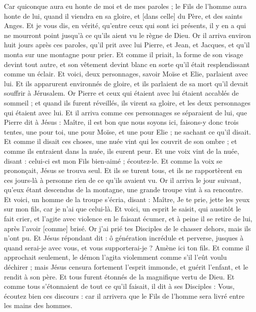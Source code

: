 \begin{multicols}{2}
Car quiconque aura eu honte de moi et de mes paroles ; le Fils de l'homme aura honte de lui, quand il viendra en sa gloire, et [dans celle] du Père, et des saints Anges.
Et je vous dis, en vérité, qu'entre ceux qui sont ici présents, il y en a qui ne mourront point jusqu'à ce qu'ils aient vu le règne de Dieu.
Or il arriva environ huit jours après ces paroles, qu'il prit avec lui Pierre, et Jean, et Jacques, et qu'il monta sur une montagne pour prier.
Et comme il priait, la forme de son visage devint tout autre, et son vêtement devint blanc en sorte qu'il était resplendissant comme un éclair.
Et voici, deux personnages, savoir Moïse et Elie, parlaient avec lui.
Et ils apparurent environnés de gloire, et ils parlaient de sa mort qu'il devait souffrir à Jérusalem.
Or Pierre et ceux qui étaient avec lui étaient accablés de sommeil ; et quand ils furent réveillés, ils virent sa gloire, et les deux personnages qui étaient avec lui.
Et il arriva comme ces personnages se séparaient de lui, que Pierre dit à Jésus : Maître, il est bon que nous soyons ici, faisons-y donc trois tentes, une pour toi, une pour Moïse, et une pour Elie ; ne sachant ce qu'il disait.
Et comme il disait ces choses, une nuée vint qui les couvrit de son ombre ; et comme ils entraient dans la nuée, ils eurent peur.
Et une voix vint de la nuée, disant : celui-ci est mon Fils bien-aimé ; écoutez-le.
Et comme la voix se prononçait, Jésus se trouva seul. Et ils se turent tous, et ils ne rapportèrent en ces jours-là à personne rien de ce qu'ils avaient vu.
Or il arriva le jour suivant, qu'eux étant descendus de la montagne, une grande troupe vint à sa rencontre.
Et voici, un homme de la troupe s'écria, disant : Maître, Je te prie, jette les yeux sur mon fils, car je n'ai que celui-là.
Et voici, un esprit le saisit, qui aussitôt le fait crier, et l'agite avec violence en le faisant écumer, et à peine il se retire de lui, après l'avoir [comme] brisé.
Or j'ai prié tes Disciples de le chasser dehors, mais ils n'ont pu.
Et Jésus répondant dit : ô génération incrédule et perverse, jusques à quand serai-je avec vous, et vous supporterai-je ? Amène ici ton fils.
Et comme il approchait seulement, le démon l'agita violemment comme s'il l'eût voulu déchirer ; mais Jésus censura fortement l'esprit immonde, et guérit l'enfant, et le rendit à son père.
Et tous furent étonnés de la magnifique vertu de Dieu. Et comme tous s'étonnaient de tout ce qu'il faisait, il dit à ses Disciples :
Vous, écoutez bien ces discours : car il arrivera que le Fils de l'homme sera livré entre les mains des hommes.

\end{multicols}
